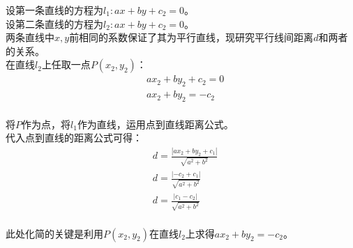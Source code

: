 \documentclass[UTF8]{ctexart}
\begin{document}
    设第一条直线的方程为$l_1:ax+by+c_2=0$。\\[3mm]
    设第二条直线的方程为$l_2:ax+by+c_2=0$。\\[3mm]
    两条直线中$x,y$前相同的系数保证了其为平行直线，现研究平行线间距离$d$和两者的关系。\\[6mm]
    在直线$l_2$上任取一点$P(x_2,y_2)$：
    \begin{align}
        &ax_2+by_2+c_2=0\\[3mm]
        &ax_2+by_2=-c_2
    \end{align}\\
    将$P$作为点，将$l_1$作为直线，运用点到直线距离公式。\\[3mm]
    代入点到直线的距离公式可得：
    \begin{align}
        &d=\frac{|ax_2+by_2+c_1|}{\sqrt{a^2+b^2}}\\[3mm]
        &d=\frac{|-c_2+c_1|}{\sqrt{a^2+b^2}}\\[3mm]
        &d=\frac{|c_1-c_2|}{\sqrt{a^2+b^2}}
    \end{align}\\
    此处化简的关键是利用$P(x_2,y_2)$在直线$l_2$上求得$ax_2+by_2=-c_2$。

\newpage
\end{document}
